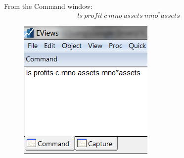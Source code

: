 \documentclass[12pt]{report}
\begin{document}
\noindent From the Command window:
$$ls\ profit\ c\ mno\ assets\ mno^*assets$$
\begin{figure}[H]
	\centering
	\includegraphics{q1_1}
\end{figure}
\vspace{-\baselineskip}
\end{document}
